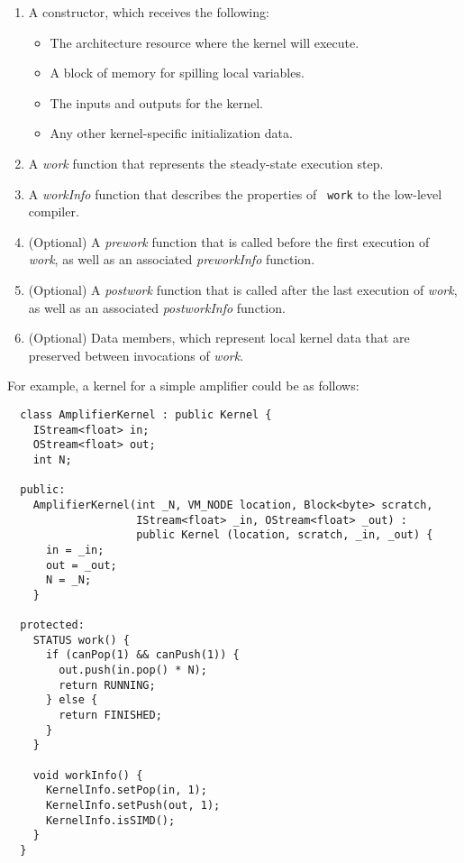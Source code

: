 \begin{enumerate}

\item A constructor, which receives the following:

\begin{itemize}
\item The architecture resource where the kernel will execute.
\item A block of memory for spilling local variables.
\item The inputs and outputs for the kernel.
\item Any other kernel-specific initialization data.
\end{itemize}

\item A {\it work} function that represents the steady-state execution
step.

\item A {\it workInfo} function that describes the properties of {\tt
work} to the low-level compiler.

\item (Optional) A {\it prework} function that is called before the
first execution of {\it work}, as well as an associated {\it
preworkInfo} function.

\item (Optional) A {\it postwork} function that is called after the
last execution of {\it work}, as well as an associated {\it
postworkInfo} function.

\item (Optional) Data members, which represent local kernel data that
are preserved between invocations of {\it work}.

\end{enumerate}

\noindent For example, a kernel for a simple amplifier could be as follows:
{\small
\begin{verbatim}
  class AmplifierKernel : public Kernel {
    IStream<float> in;
    OStream<float> out;
    int N;

  public:
    AmplifierKernel(int _N, VM_NODE location, Block<byte> scratch, 
                    IStream<float> _in, OStream<float> _out) : 
                    public Kernel (location, scratch, _in, _out) {
      in = _in;
      out = _out;
      N = _N;
    }

  protected:
    STATUS work() {
      if (canPop(1) && canPush(1)) {
        out.push(in.pop() * N);
        return RUNNING;
      } else {
        return FINISHED;
      }
    }

    void workInfo() {
      KernelInfo.setPop(in, 1);
      KernelInfo.setPush(out, 1);
      KernelInfo.isSIMD();
    }
  }  
\end{verbatim}}


